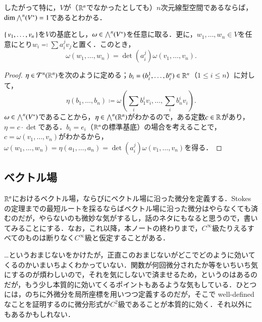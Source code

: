 したがって特に，$V$が（$\mathbb{R}^n$でなかったとしても）$n$次元線型空間であるならば，$\dim \bigwedge^n(V^*)=1$であるとわかる．

\begin{lem}\label{最高次交代テンソルの変換則}
$\set{v_1, \dots, v_n}$を$V$の基底とし，$\omega \in \bigwedge^n(V^*)$を任意に取る．更に，$w_1, \dots, w_n \in V$を任意にとり$w_i \eqqcolon \sum a_i^j v_j$と置く．このとき，
\begin{equation}
\omega(w_1, \dots, w_n) = \det \left( a_i^j \right) \omega(v_1, \dots, v_n).
\end{equation}
\end{lem}

\begin{proof}
$\eta \in \mathcal{T}^n(\mathbb{R}^n)$を次のように定める；$b_i = (b_i^1, \dots, b_i^n) \in \mathbb{R}^n$（$1 \leq i \leq n$）に対して，
\begin{equation}
\eta (b_1, \dots, b_n) \coloneqq \omega \left(\sum_i b_1^i v_i, \dots, \sum_i b_n^i v_i \right).
\end{equation}$\omega \in \bigwedge^n(V^*)$であることから，$\eta \in \bigwedge^n(\mathbb{R}^n)$がわかるので，ある定数$c \in \mathbb{R}$があり，$\eta = c \cdot \det$である．$b_i = e_i$（$\mathbb{R}^n$の標準基底）の場合を考えることで，$c = \omega(v_1, \dots, v_n)$がわかるから，$\omega(w_1, \dots, w_n) = \eta (a_1, \dots, a_n) = \det \left( a_i^j \right) \omega(v_1, \dots, v_n)$を得る．
\end{proof}

\subsection{ベクトル場}

$\mathbb{R}^n$におけるベクトル場，ならびにベクトル場に沿った微分を定義する．Stokes の定理までの最短ルートを採るならばベクトル場に沿った微分はやらなくても済むのだが，やらないのも微妙な気がするし，話のネタにもなると思うので，書いてみることにする．なお，これ以降，本ノートの終わりまで，$C^\infty$級たりえるすべてのものは断りなく$C^\infty$級と仮定することがある．


\begin{que}[**]
…というおまじないをかけたが，正直このおまじないがどこでどのように効いてくるのかいまいちよくわかっていない．関数が何回微分されたか等をいちいち気にするのが煩わしいので，それを気にしないで済ませるため，というのはあるのだが，もう少し本質的に効いてくるポイントもあるような気もしている．ひとつには，のちに外微分を局所座標を用いつつ定義するのだが，そこで well-defined なことを証明するのに微分形式が$C^2$級であることが本質的に効く．それ以外にもあるかもしれない．
\end{que}

